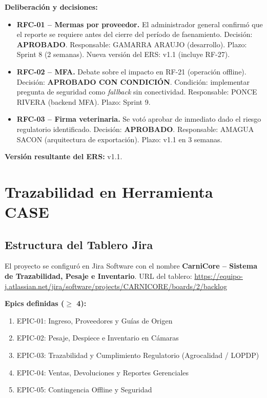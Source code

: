 \documentclass[11pt,a4paper]{article}
\begin{document}
\textbf{Deliberación y decisiones:}
\begin{itemize}[nosep]
\item \textbf{RFC-01 -- Mermas por proveedor.} El administrador general confirmó que el reporte se requiere antes del cierre del período de faenamiento. Decisión: \textbf{APROBADO}. Responsable: GAMARRA ARAUJO (desarrollo). Plazo: Sprint 8 (2 semanas). Nueva versión del ERS: v1.1 (incluye RF-27).
\item \textbf{RFC-02 -- MFA.} Debate sobre el impacto en RF-21 (operación offline). Decisión: \textbf{APROBADO CON CONDICIÓN}. Condición: implementar pregunta de seguridad como \textit{fallback} sin conectividad. Responsable: PONCE RIVERA (backend MFA). Plazo: Sprint 9.
\item \textbf{RFC-03 -- Firma veterinaria.} Se votó aprobar de inmediato dado el riesgo regulatorio identificado. Decisión: \textbf{APROBADO}. Responsable: AMAGUA SACON (arquitectura de exportación). Plazo: v1.1 en 3 semanas.
\end{itemize}
\textbf{Versión resultante del ERS:} v1.1.

\section{Trazabilidad en Herramienta CASE}
\subsection{Estructura del Tablero Jira}
El proyecto se configuró en Jira Software con el nombre \textbf{CarniCore -- Sistema de
Trazabilidad, Pesaje e Inventario}. URL del tablero: \url{https://equipo-j.atlassian.net/jira/software/projects/CARNICORE/boards/2/backlog}

\textbf{Epics definidas (\(\geq\) 4):}
\begin{enumerate}[nosep]
\item EPIC-01: Ingreso, Proveedores y Guías de Origen
\item EPIC-02: Pesaje, Despiece e Inventario en Cámaras
\item EPIC-03: Trazabilidad y Cumplimiento Regulatorio (Agrocalidad / LOPDP)
\item EPIC-04: Ventas, Devoluciones y Reportes Gerenciales
\item EPIC-05: Contingencia Offline y Seguridad
\end{enumerate}
\end{document}
